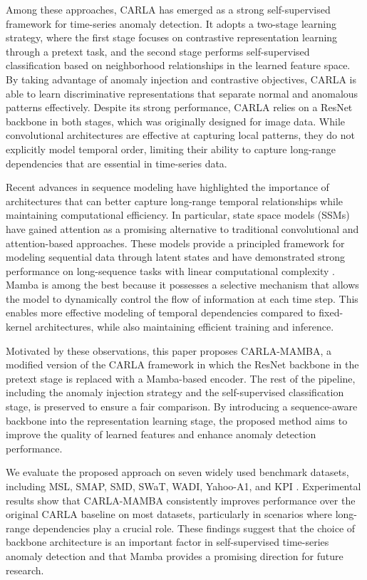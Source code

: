 \documentclass{svproc}
\begin{document}
Among these approaches, CARLA \cite{darban2024carla} has emerged as a strong self-supervised framework for time-series anomaly detection. It adopts a two-stage learning strategy, where the first stage focuses on contrastive representation learning through a pretext task, and the second stage performs self-supervised classification based on neighborhood relationships in the learned feature space. By taking advantage of anomaly injection and contrastive objectives, CARLA is able to learn discriminative representations that separate normal and anomalous patterns effectively. Despite its strong performance, CARLA relies on a ResNet backbone \cite{fawaz2019deep} in both stages, which was originally designed for image data. While convolutional architectures are effective at capturing local patterns, they do not explicitly model temporal order, limiting their ability to capture long-range dependencies that are essential in time-series data.

Recent advances in sequence modeling have highlighted the importance of architectures that can better capture long-range temporal relationships while maintaining computational efficiency. In particular, state space models (SSMs) have gained attention as a promising alternative to traditional convolutional and attention-based approaches. These models provide a principled framework for modeling sequential data through latent states and have demonstrated strong performance on long-sequence tasks with linear computational complexity \cite{gu2022efficiently}. Mamba \cite{gu2023mamba} is among the best because it possesses a selective mechanism that allows the model to dynamically control the flow of information at each time step. This enables more effective modeling of temporal dependencies compared to fixed-kernel architectures, while also maintaining efficient training and inference.

Motivated by these observations, this paper proposes CARLA-MAMBA, a modified version of the CARLA framework in which the ResNet backbone in the pretext stage is replaced with a Mamba-based encoder. The rest of the pipeline, including the anomaly injection strategy and the self-supervised classification stage, is preserved to ensure a fair comparison. By introducing a sequence-aware backbone into the representation learning stage, the proposed method aims to improve the quality of learned features and enhance anomaly detection performance.

We evaluate the proposed approach on seven widely used benchmark datasets, including MSL, SMAP, SMD, SWaT, WADI, Yahoo-A1, and KPI \cite{hundman2018detecting,su2019robust,mathur2016swat,ahmed2017wadi,laptev2015benchmark}. Experimental results show that CARLA-MAMBA consistently improves performance over the original CARLA baseline on most datasets, particularly in scenarios where long-range dependencies play a crucial role. These findings suggest that the choice of backbone architecture is an important factor in self-supervised time-series anomaly detection and that Mamba provides a promising direction for future research.
\end{document}
